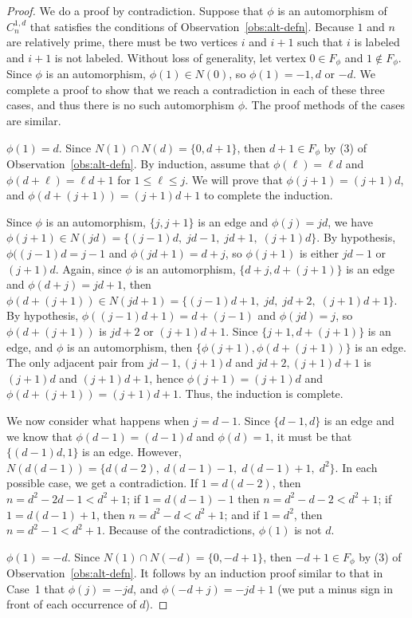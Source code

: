\documentclass[10pt,a4paper]{amsart}
\begin{document}
\begin{proof}  We do a proof by contradiction. Suppose that $\phi$ is an automorphism of 
$C_n^{1,d}$ that satisfies the conditions of Observation~\ref{obs:alt-defn}. Because $1$ and $n$ are relatively prime, there must be two vertices $i$ and $i+1$ such that $i$ is labeled and $i+1$ is not labeled.  Without loss of generality, let vertex $0\in F_{\phi}$ and $1\not\in F_{\phi}$. 
Since $\phi$ is an automorphism, $\phi(1)\in N(0)$, so $\phi(1)=-1, d$ or $-d$. We complete a proof to show that we reach a contradiction in each of these three cases, and thus there is no such automorphism $\phi$. The proof methods of the cases are similar. 

 $\phi(1)=d$. Since $N(1)\cap N(d)=\{0,d+1\}$, then $d+1\in F_{\phi}$ by (3) of Observation~\ref{obs:alt-defn}. By induction, assume that $\phi(\ell)=\ell d$ and  $\phi(d+\ell)=\ell d+1$ for $1\leq \ell\leq j$. We will prove that
$\phi(j+1)=(j+1)d$, and $\phi(d+(j+1))=(j+1)d+1$ to complete the induction. 

Since $\phi$ is an automorphism, $\{j, j+1\}$ is an edge and $\phi(j)=jd$, we have $\phi(j+1)\in N(jd)=\{(j-1)d, \;jd-1,\; jd+1,\; (j+1)d\}$. By hypothesis, $\phi((j-1)d=j-1$ and $\phi(jd+1)=d+j$, so $\phi(j+1)$ is either $jd-1$ or $(j+1)d$. 
Again, since $\phi$ is an automorphism, $\{d+j, d+(j+1)\}$ is an edge and $\phi(d+j)=jd+1$, then $\phi(d+(j+1))\in N(jd+1)=\{(j-1)d+1,\; jd,\; jd+2, \;(j+1)d+1\}$. By hypothesis, $
\phi((j-1)d+1)=d+(j-1)$ and $\phi(jd)=j$, so $\phi(d+(j+1))$ is $jd+2$ or $(j+1)d+1$. Since $\{j+1, d+(j+1)\}$ is an edge, and $\phi$ is an automorphism, then $\{\phi(j+1),\phi(d+(j+1))\}$ is an edge. The only adjacent pair from $jd-1, (j+1)d$ and $jd+2, (j+1)d+1$ is $(j+1)d$ and $(j+1)d+1$, 
hence $\phi(j+1)=(j+1)d$ and $\phi(d+(j+1))=(j+1)d+1$. Thus, the induction is complete. 

We now consider what happens when $j=d-1$. Since $\{d-1,d\}$ is an edge and we know that $\phi(d-1)=(d-1)d$ and $\phi(d)=1$, it must be that $\{(d-1)d, 1\}$ is an edge. 
However, $N(d(d-1)) =\{d(d-2), \;d(d-1)-1, \;d(d-1)+1, \;d^2\}$. In each possible case, we get a contradiction.  
If $1=d(d-2)$, then $n=d^2-2d-1<d^2+1$; if $1=d(d-1)-1$ then $n=d^2-d-2<d^2+1$; if $1=d(d-1)+1$, then $n=d^2-d<d^2+1$; and if $1=d^2$, then $n=d^2-1<d^2+1$. 
Because of the contradictions, $\phi(1)$ is not $d$.  

 $\phi(1)=-d$. Since $N(1)\cap N(-d)=\{0,-d+1\}$, then $-d+1\in F_{\phi}$ by (3) of Observation~\ref{obs:alt-defn}. It follows by an induction proof similar to that in Case~1 that $\phi(j)=-j d$, and $\phi(-d+j)=-j d+1$ (we put a minus sign in front of each occurrence of $d$). 


\end{proof}
\end{document}
